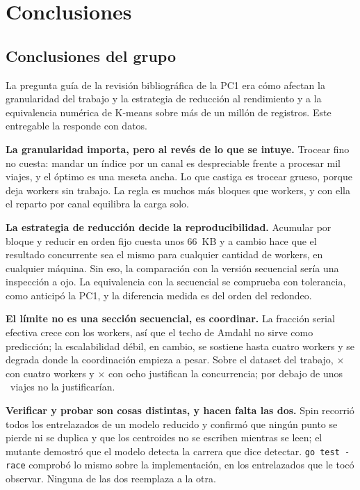\section{Conclusiones}

\subsection{Conclusiones del grupo}

La pregunta guía de la revisión bibliográfica de la PC1 era cómo afectan la granularidad del trabajo
y la estrategia de reducción al rendimiento y a la equivalencia numérica de K-means sobre más de un
millón de registros. Este entregable la responde con datos.

\textbf{La granularidad importa, pero al revés de lo que se intuye.} Trocear fino no cuesta: mandar
un índice por un canal es despreciable frente a procesar mil viajes, y el óptimo es una meseta ancha.
Lo que castiga es trocear grueso, porque deja workers sin trabajo. La regla es muchos más bloques que
workers, y con ella el reparto por canal equilibra la carga solo.

\textbf{La estrategia de reducción decide la reproducibilidad.} Acumular por bloque y reducir en
orden fijo cuesta unos 66~KB y a cambio hace que el resultado concurrente sea el mismo para
cualquier cantidad de workers, en cualquier máquina. Sin eso, la comparación con la versión
secuencial sería una inspección a ojo. La equivalencia con la secuencial se comprueba con tolerancia,
como anticipó la PC1, y la diferencia medida es del orden del redondeo.

\textbf{El límite no es una sección secuencial, es coordinar.} La fracción serial efectiva crece con
los workers, así que el techo de Amdahl no sirve como predicción; la escalabilidad débil, en cambio,
se sostiene hasta cuatro workers y se degrada donde la coordinación empieza a pesar. Sobre el
dataset del trabajo, $\times$ con cuatro workers y $\times$ con
ocho justifican la concurrencia; por debajo de unos ~viajes no la justificarían.

\textbf{Verificar y probar son cosas distintas, y hacen falta las dos.} Spin recorrió todos los
entrelazados de un modelo reducido y confirmó que ningún punto se pierde ni se duplica y que los
centroides no se escriben mientras se leen; el mutante demostró que el modelo detecta la carrera que
dice detectar. \texttt{go test -race} comprobó lo mismo sobre la implementación, en los entrelazados
que le tocó observar. Ninguna de las dos reemplaza a la otra.

